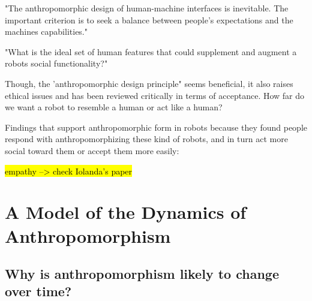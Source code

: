 \documentclass{frontiersSCNS} %
\begin{document}
	

"The anthropomorphic design of human-machine interfaces is inevitable. The
important criterion is to seek a balance between people's expectations and the
machines capabilities." \cite{duffy_anthropomorphism_2002}

"What is the ideal set of human features that could supplement and augment a
robots  social functionality?" \cite{duffy_anthropomorphism_2002}


Though, the 'anthropomorphic design principle" seems beneficial, it also raises
ethical issues and has been reviewed critically in terms of acceptance. How far
do we want a robot to resemble a human or act like a human?

Findings that support anthropomorphic form in robots because they found people
respond with anthropomorphizing these kind of robots, and in turn act more
social toward them or accept them more easily:

	\hl{empathy --> check Iolanda's paper}

	
	
%
%
%
%
%
%

\section{A Model of the Dynamics of Anthropomorphism}
\label{sec:dynamics_model}





\subsection{Why is anthropomorphism likely to change over time?}
\label{sec:whychanges}
\end{document}
